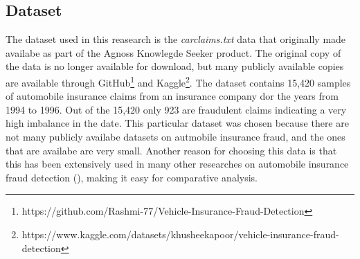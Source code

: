 \documentclass[twoside,11pt]{article}
\begin{document}
\subsection{Dataset}
The dataset used in this reasearch is the \emph{carclaims.txt} data that originally made availabe as part of the Agnoss Knowlegde Seeker product. The original copy of the data is no longer available for download, but many publicly available copies are available through GitHub\footnote{https://github.com/Rashmi-77/Vehicle-Insurance-Fraud-Detection} and Kaggle\footnote{https://www.kaggle.com/datasets/khusheekapoor/vehicle-insurance-fraud-detection}. The dataset contains 15,420 samples of automobile insurance claims from an insurance company dor the years from 1994 to 1996. Out of the 15,420 only 923 are fraudulent claims indicating a very high imbalance in the date. This particular dataset was chosen because there are not many publicly availabe datasets on autmobile insurance fraud, and the ones that are availabe are very small. Another reason for choosing this data is that this has been extensively used in many other researches on automobile insurance fraud detection (\citealp{}), making it easy for comparative analysis.
\end{document}

